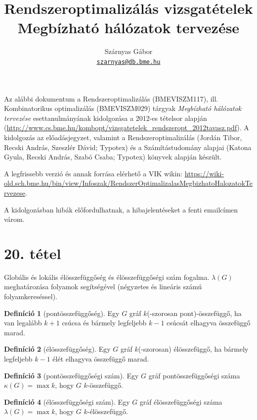 \documentclass{article}
\title{Rendszeroptimalizálás vizsgatételek\\Megbízható hálózatok tervezése}
\author{Szárnyas Gábor \\ \href{mailto:szarnyas@db.bme.hu}{\nolinkurl{szarnyas@db.bme.hu}}}
\theoremstyle{definition}
\newtheorem*{definicio}{Definíció}
\begin{document}
\maketitle

Az alábbi dokumentum a Rendszeroptimalizálás (BMEVISZM117), ill. Kombinatorikus optimalizálás (BMEVISZM029) tárgyak {\it Megbízható hálózatok tervezése} esettanulmányának kidolgozása a 2012-es tételsor alapján (\url{http://www.cs.bme.hu/kombopt/vizsgatetelek_rendszeropt_2012tavasz.pdf}).
A kidolgozás az előadásjegyzet, valamint a Rendszeroptimalizálás (Jordán Tibor, Recski András, Szeszlér Dávid; Typotex) és a Számítástudomány alapjai (Katona Gyula, Recski András, Szabó Csaba; Typotex) könyvek alapján készült.

A legfrissebb verzió és annak forrása elérhető a VIK wikin: \url{https://wiki-old.sch.bme.hu/bin/view/Infoszak/RendszerOptimalizalasMegbizhatoHalozatokTervezese}.

A kidolgozásban hibák előfordulhatnak, a hibajelentéseket a fenti emailcímen várom.


\section*{20. tétel}
\begin{framed}
Globális és lokális élösszefüggőség és élösszefüggőségi szám fogalma. $\lambda(G)$ meghatározása folyamok segítségével (négyzetes és lineáris számú folyamkereséssel).
\end{framed}

\begin{definicio}[pontösszefüggőség]
Egy $G$ gráf $k$(-szorosan pont)-összefüggő, ha van legalább $k+1$ csúcsa és bármely legfeljebb $k-1$ csúcsát elhagyva összefüggő marad.
\end{definicio}

\begin{definicio}[élösszefüggőség]
Egy $G$ gráf $k$(-szorosan) élösszefüggő, ha bármely legfeljebb $k-1$ élét elhagyva összefüggő marad.
\end{definicio}
 
\begin{definicio}[pontösszefüggőségi szám]
Egy $G$ gráf pontösszefüggőségi száma $\kappa(G) = \max k$, hogy $G$ $k$-összefüggő.
\end{definicio}
 
\begin{definicio}[élösszefüggőségi szám]
Egy $G$ gráf élösszefüggőségi száma $\lambda(G) = \max k$, hogy $G$ $k$-élösszefüggő.
\end{definicio}
 
\end{document}

